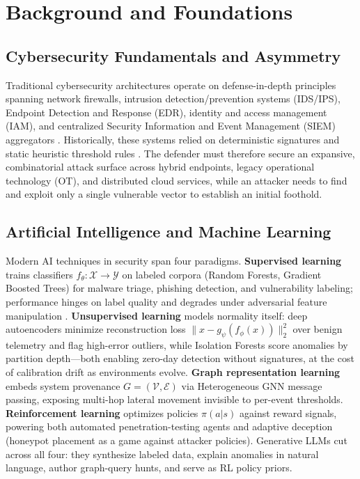 \documentclass[conference,10pt,twocolumn,a4paper]{IEEEtran}
\begin{document}
\section{Background and Foundations}
\label{sec:background}
\subsection{Cybersecurity Fundamentals and Asymmetry}
Traditional cybersecurity architectures operate on defense-in-depth principles spanning network firewalls, intrusion detection/prevention systems (IDS/IPS), Endpoint Detection and Response (EDR), identity and access management (IAM), and centralized Security Information and Event Management (SIEM) aggregators \cite{nist_csf_ai_2026}. Historically, these systems relied on deterministic signatures and static heuristic threshold rules \cite{mirsky2018kitsune}. The defender must therefore secure an expansive, combinatorial attack surface across hybrid endpoints, legacy operational technology (OT), and distributed cloud services, while an attacker needs to find and exploit only a single vulnerable vector to establish an initial foothold.

\subsection{Artificial Intelligence and Machine Learning}
Modern AI techniques in security span four paradigms. \textbf{Supervised learning} trains classifiers $f_\theta: \mathcal{X} \to \mathcal{Y}$ on labeled corpora (Random Forests, Gradient Boosted Trees) for malware triage, phishing detection, and vulnerability labeling; performance hinges on label quality and degrades under adversarial feature manipulation \cite{mirsky2018kitsune, nist_sp_ai_100_2e2025}. \textbf{Unsupervised learning} models normality itself: deep autoencoders minimize reconstruction loss $\|x - g_\psi(f_\phi(x))\|_2^2$ over benign telemetry and flag high-error outliers, while Isolation Forests score anomalies by partition depth---both enabling zero-day detection without signatures, at the cost of calibration drift as environments evolve. \textbf{Graph representation learning} embeds system provenance $G=(\mathcal{V},\mathcal{E})$ via Heterogeneous GNN message passing, exposing multi-hop lateral movement invisible to per-event thresholds. \textbf{Reinforcement learning} optimizes policies $\pi(a|s)$ against reward signals, powering both automated penetration-testing agents and adaptive deception (honeypot placement as a game against attacker policies). Generative LLMs cut across all four: they synthesize labeled data, explain anomalies in natural language, author graph-query hunts, and serve as RL policy priors.
\end{document}

